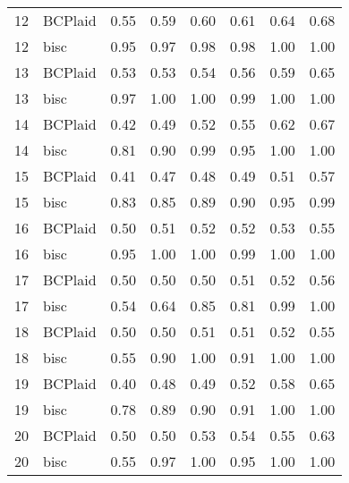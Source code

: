 \begin{table}[ht]
\begin{tabular}{rlrrrrrr}
   12 & BCPlaid & 0.55 & 0.59 & 0.60 & 0.61 & 0.64 & 0.68 \\ 
   12 & bisc & 0.95 & 0.97 & 0.98 & 0.98 & 1.00 & 1.00 \\ 
   13 & BCPlaid & 0.53 & 0.53 & 0.54 & 0.56 & 0.59 & 0.65 \\ 
   13 & bisc & 0.97 & 1.00 & 1.00 & 0.99 & 1.00 & 1.00 \\ 
   14 & BCPlaid & 0.42 & 0.49 & 0.52 & 0.55 & 0.62 & 0.67 \\ 
   14 & bisc & 0.81 & 0.90 & 0.99 & 0.95 & 1.00 & 1.00 \\ 
   15 & BCPlaid & 0.41 & 0.47 & 0.48 & 0.49 & 0.51 & 0.57 \\ 
   15 & bisc & 0.83 & 0.85 & 0.89 & 0.90 & 0.95 & 0.99 \\ 
   16 & BCPlaid & 0.50 & 0.51 & 0.52 & 0.52 & 0.53 & 0.55 \\ 
   16 & bisc & 0.95 & 1.00 & 1.00 & 0.99 & 1.00 & 1.00 \\ 
   17 & BCPlaid & 0.50 & 0.50 & 0.50 & 0.51 & 0.52 & 0.56 \\ 
   17 & bisc & 0.54 & 0.64 & 0.85 & 0.81 & 0.99 & 1.00 \\ 
   18 & BCPlaid & 0.50 & 0.50 & 0.51 & 0.51 & 0.52 & 0.55 \\ 
   18 & bisc & 0.55 & 0.90 & 1.00 & 0.91 & 1.00 & 1.00 \\ 
   19 & BCPlaid & 0.40 & 0.48 & 0.49 & 0.52 & 0.58 & 0.65 \\ 
   19 & bisc & 0.78 & 0.89 & 0.90 & 0.91 & 1.00 & 1.00 \\ 
   20 & BCPlaid & 0.50 & 0.50 & 0.53 & 0.54 & 0.55 & 0.63 \\ 
   20 & bisc & 0.55 & 0.97 & 1.00 & 0.95 & 1.00 & 1.00 \\ 
   \bottomrule
\end{tabular}
\end{table}
